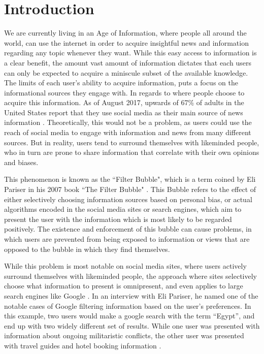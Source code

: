 \chapter{Introduction}
We are currently living in an Age of Information, where people all around the
world, can use the internet in order to acquire insightful news and information
regarding any topic whenever they want. While this easy access to information is
a clear benefit, the amount vast amount of information dictates that each
users can only be expected to acquire a miniscule subset of the available
knowledge.\\
The limits of each user's ability to acquire information, puts a focus on the
informational sources they engage with. In regards to where people choose to
acquire this information. As of August 2017, upwards of 67\% of adults in the
United States report that they use social media as their main source of news
information \citep{journalism2017}. Theoretically, this would not be a problem,
as users could use the reach of social media to engage with information and
news from many different sources. But in reality, users tend to surround
themselves with likeminded people, who in turn are prone to share information
that correlate with their own opinions and biases.\nl

This phenomenon is known as the ``Filter Bubble", which is a term coined by Eli
Pariser in his 2007 book ``The Filter Bubble" \citep{pariser2011filter}. This
Bubble refers to the effect of either selectively choosing information sources
based on personal bias, or actual algorithms encoded in the social media sites
or search engines, which aim to present the user with the information which is
most likely to be regarded positively. The existence and enforcement of this
bubble can cause problems, in which users are prevented from being exposed to
information or views that are opposed to the bubble in which they find
themselves.\nl

While this problem is most notable on social media sites, where users actively
surround themselves with likeminded people, the approach where sites selectively
choose what information to present is omnipresent, and even applies to large
search engines like Google \citep{filterBubbleDef}. In an interview with Eli
Pariser, he named one of the notable cases of Google filtering information based
on the user's preferences. In this example, two users would make a google search
with the term ``Egypt'', and end up with two widely different set of results.
While one user was presented with information about ongoing militaristic
conflicts, the other user was presented with travel guides and hotel booking
information \citep{nusSduSearch}.

